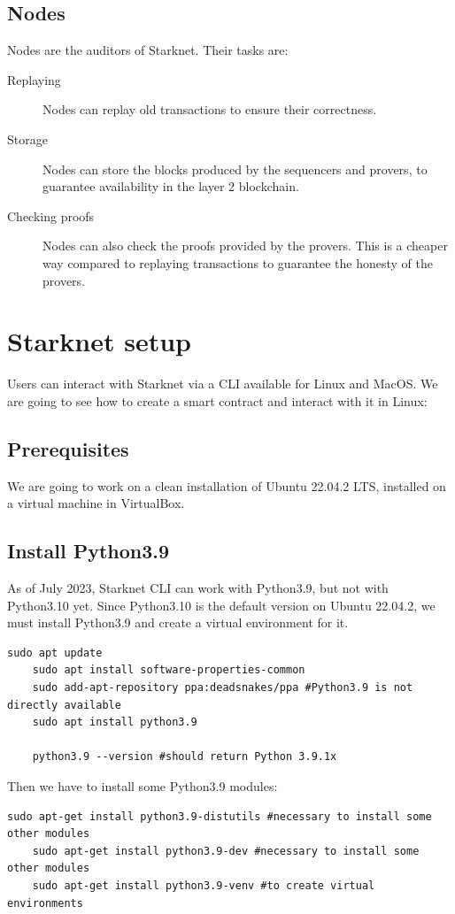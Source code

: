 \documentclass[11pt]{article}
\begin{document}
\subsection{Nodes} \label{subsection:nodes}
Nodes are the auditors of Starknet. Their tasks are:
\begin{description}
    \item[Replaying] Nodes can replay old transactions to ensure their correctness. 
    \item[Storage] Nodes can store the blocks produced by the sequencers and provers, to guarantee availability in the layer 2 blockchain.
    \item[Checking proofs] Nodes can also check the proofs provided by the provers. This is a cheaper way compared to replaying transactions to guarantee the honesty of the provers.  
\end{description}

\section{Starknet setup} \label{section:starknet_setup}
Users can interact with Starknet via a CLI available for Linux and MacOS. We are going to see how to create a smart contract and interact with it in Linux:

\subsection{Prerequisites} \label{subsection:prerequisites}
We are going to work on a clean installation of Ubuntu 22.04.2 LTS, installed on a virtual machine in VirtualBox.

\subsection{Install Python3.9}
As of July 2023, Starknet CLI can work with Python3.9, but not with Python3.10 yet. Since Python3.10 is the default version on Ubuntu 22.04.2, we must install Python3.9 and create a virtual environment for it.
\begin{lstlisting}[language=terminal]
    sudo apt update
    sudo apt install software-properties-common
    sudo add-apt-repository ppa:deadsnakes/ppa #Python3.9 is not directly available
    sudo apt install python3.9

    python3.9 --version #should return Python 3.9.1x
\end{lstlisting}

Then we have to install some Python3.9 modules:
\begin{lstlisting}[language=terminal]
    sudo apt-get install python3.9-distutils #necessary to install some other modules
    sudo apt-get install python3.9-dev #necessary to install some other modules
    sudo apt-get install python3.9-venv #to create virtual environments
\end{lstlisting}
\end{document}

